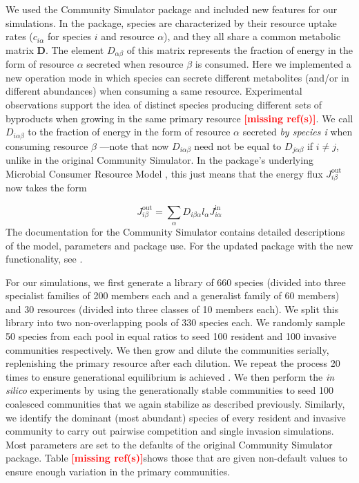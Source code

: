\documentclass[a4paper,10pt]{article}
\newcommand{\mr}{\textcolor{red}{\textbf{[missing ref(s)]}}}
\begin{document}
We used the Community Simulator package \cite{Marsland2020} and included new
features for our simulations. In the package,
species are characterized by their resource uptake rates ($c_{i\alpha}$ for
species $i$ and resource $\alpha$), and they all
share a common metabolic matrix $\mathbf{D}$.
The element $D_{\alpha\beta}$
of this matrix represents the fraction of energy in the form of resource $\alpha$
secreted when resource $\beta$ is consumed.
Here we implemented a new operation mode
in which species can secrete different metabolites (and/or
in different abundances) when consuming a same resource. Experimental observations
support the idea of distinct species producing different sets of byproducts when
growing in the same primary resource \mr. We call $D_{i\alpha\beta}$ to the
fraction of energy in the form of resource $\alpha$ secreted \textit{by species
i} when consuming resource $\beta$ ---note that now $D_{i\alpha\beta}$ need not be
equal to $D_{j\alpha\beta}$ if $i \neq j$, unlike in the original Community
Simulator. In the package's underlying Microbial Consumer Resource Model
\cite{Goldford2018,Marsland2019}, this just means that the energy flux
$J^{\mathrm{out}}_{i\beta}$ now takes the form

\begin{equation}
J^{\mathrm{out}}_{i\beta} = \sum_\alpha D_{i\beta\alpha} l_\alpha J^{\mathrm{in}}_{i\alpha}
\label{eq:jout}
\end{equation}
%
The documentation for the Community Simulator contains detailed
descriptions of the model, parameters and package use. For the updated package with
the new functionality, see .

For our simulations,
we first generate a library of 660 species (divided into three specialist
families of 200 members each
and a generalist family of 60 members)
and 30 resources (divided into three classes of 10 members each).
We split this library into two non-overlapping pools of 330 species each.
We randomly sample 50 species from each pool in equal ratios to seed
100 resident and
100 invasive communities respectively.
We then grow and dilute the communities serially,
replenishing the primary
resource after each dilution.
We repeat the process 20 times to ensure generational equilibrium is
achieved \cite{Goldford2018}.
We then perform the \textit{in silico} experiments by using the
generationally stable communities to seed 100 coalesced communities
that we again stabilize as described previously.
Similarly, we identify the dominant (most
abundant) species of every resident and invasive community to carry out pairwise
competition and single invasion simulations.
Most parameters are set to the defaults of the original Community Simulator
package. Table \mr shows those that are given non-default values to ensure
enough variation in the primary communities.
\end{document}
